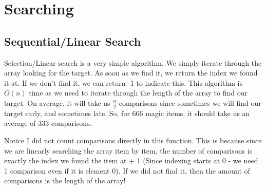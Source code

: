 \documentclass[letterpaper, 10pt]{article}
\begin{document}
\newpage

\section{Searching}
\subsection{Sequential/Linear Search}
Selection/Linear search is a very simple algorithm. We simply iterate through the array looking for the target. As soon as we find it, we return the index we found it at. If we don't find it, we can return -1 to indicate this. This algorithm is $O(n)$ time as we need to iterate through the length of the array to find our target. On average, it will take us $\frac{n}{2}$ comparisons since sometimes we will find our target early, and sometimes late. So, for 666 magic items, it should take us an average of 333 comparisons.


Notice I did not count comparisons directly in this function. This is because since we are linearly searching the array item by item, the number of comparisons is exactly the index we found the item at + 1 (Since indexing starts at 0 - we need 1 comparison even if it is element 0). If we did not find it, then the amount of comparisons is the length of the array! 
\newpage
\end{document}
